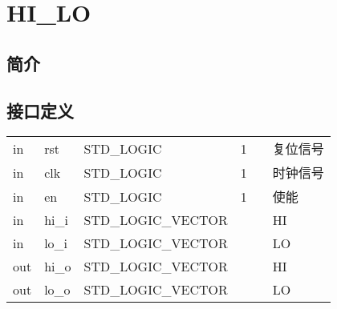 \documentclass{article}
\begin{document}
\section{HI_LO}
\label{sec:HI_LO}

\subsection{简介}

\FloatBarrier
\subsection{接口定义}

\begin{center}




    \tablelasttail{\bottomrule}

    \small
    \begin{supertabular}{lllllp{2cm}}

    in & rst\label{HI/LO:rst} & STD_LOGIC & 1 &  & 复位信号 \\
    in & clk\label{HI/LO:clk} & STD_LOGIC & 1 &  & 时钟信号 \\
    in & en\label{HI/LO:en} & STD_LOGIC & 1 &  & 使能 \\
    in & hi_i\label{HI/LO:hi_i} & STD_LOGIC_VECTOR &  &  & HI \\
    in & lo_i\label{HI/LO:lo_i} & STD_LOGIC_VECTOR &  &  & LO \\
    out & hi_o\label{HI/LO:hi_o} & STD_LOGIC_VECTOR &  &  & HI \\
    out & lo_o\label{HI/LO:lo_o} & STD_LOGIC_VECTOR &  &  & LO \\
    
    \end{supertabular}
\end{center}
\FloatBarrier
\end{document}
